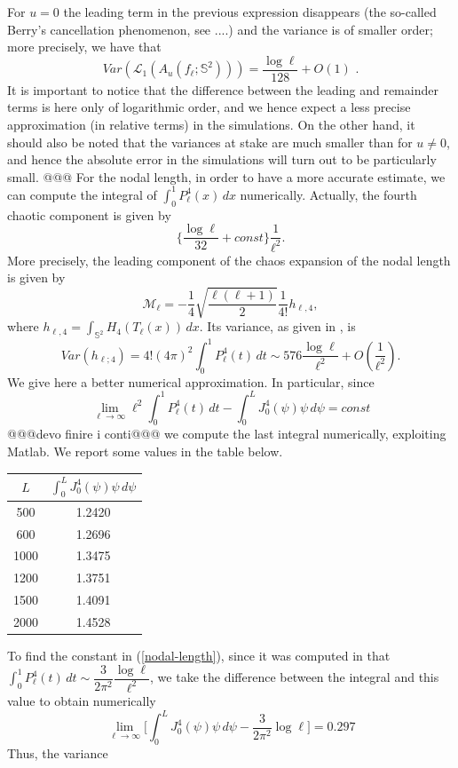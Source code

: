 \documentclass[aps,prd,showpacs,superscriptaddress,groupedaddress]{revtex4-1}  %
\begin{document}
For $u=0$ the leading term in the previous expression disappears (the so-called Berry's cancellation phenomenon, see ....) and the variance is of smaller order; more precisely, we have that
\begin{equation*}
Var \left( \mathcal{L}_{1}(A_{u}(f_{\ell };\mathbb{S}^{2})) \right) =\frac{\log \ell}{128}+O(1) \text{ .}
\end{equation*}
It is important to notice that the difference between the leading and remainder terms is here only of logarithmic order, and we hence expect a less precise approximation (in relative terms) in the simulations. On the other hand, it should also be noted that the variances at stake are much smaller than for $u \neq 0$, and hence the absolute error in the simulations will turn out to be particularly small.
@@@
For the nodal length, in order to have a more accurate estimate, we can compute the integral of $\int_{0}^{1} P_\ell^4(x) \,dx$ numerically. Actually, the fourth chaotic component is given by 
\begin{equation}\label{nodal-length}
\bigg\{\dfrac{\log \ell}{32}+const\bigg\} \dfrac{1}{\ell^2}.
\end{equation}
More precisely, the leading component of the chaos expansion of the nodal length is given by
$$\mathcal{M}_\ell=-\dfrac{1}{4} \sqrt{\dfrac{\ell(\ell+1)}{2}} \dfrac{1}{4!} h_{\ell,4},$$
where $h_{\ell,4}=\int_{\mathbb{S}^2}H_4(T_\ell(x))\,dx$. Its variance, as given in \cite{}, is
$$Var(h_{\ell;4})=4! (4\pi)^2 \int_{0}^{1} P_\ell^4(t) \,dt \sim 576 \frac{\log \ell}{\ell^2}+O(\frac{1}{\ell^2}).$$ We give here a better numerical approximation. In particular, since
$$\lim_{\ell \rightarrow \infty} \ell^2 \int_{0}^{1} P_\ell^4(t)\, dt - \int_{0}^{L} J_0^4(\psi) \psi \,d\psi=const$$ @@@devo finire i conti@@@ we compute the last integral numerically, exploiting Matlab. We report some values in the table below.
\begin{center}
\begin{tabular}{|c|c|}
	\hline
	$L$ &\textbf{	$\int_{0}^{L} J_0^4(\psi)\psi\,d\psi$ } \\
	\hline 500 & 1.2420\\
	\hline 600&  1.2696\\
	\hline  1000 &  1.3475 \\
	\hline 1200 & 1.3751\\
	\hline 1500 & 1.4091 \\
	\hline 2000 & 1.4528 \\
	\hline
\end{tabular}
\end{center}
To find the constant in (\ref{nodal-length}), since it was computed in \cite{} that $\int_{0}^{1} P_\ell^4(t) \,dt \sim \dfrac{3}{2\pi^2} \dfrac{\log \ell}{\ell^2}$, we take the difference between the integral and this value to obtain numerically
$$\lim_{\ell \rightarrow \infty} \big[\int_{0}^{L} J_0^4(\psi) \psi \, d\psi -\dfrac{3}{2\pi^2} \log \ell \big]=0.297$$
Thus, the variance 
\end{document}
